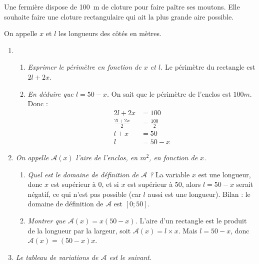 \documentclass[11pt]{article}
\begin{document}
\begin{exercice}
  Une fermière dispose de 100~m de cloture pour faire paître ses moutons. Elle souhaite faire une cloture rectangulaire qui ait la plus grande aire possible.

  \begin{center}
  \end{center}
  On appelle $x$ et $l$ les longueurs des côtés en mètres.
  \begin{enumerate}
    \item 
      \begin{enumerate}
        \item \emph{Exprimer le périmètre en fonction de $x$ et $l$.} Le périmètre du rectangle est $2l+2x$.
        \item \emph{En déduire que $l=50-x$.} On sait que le périmètre de l'enclos est $100m$. Donc :
          \begin{align*}
            2l+2x&=100\\
            \frac{2l+2x}{2}&=\frac{100}{2}\\
            l+x&=50\\
            l&=50-x
          \end{align*}
      \end{enumerate}
    \item \emph{On appelle $\mathcal{A}(x)$ l'aire de l'enclos, en $m^2$, en fonction de $x$.}
      \begin{enumerate}
        \item \emph{Quel est le domaine de définition de $\mathcal{A}$ ?} La variable $x$ est une longueur, donc $x$ est supérieur à 0, et si $x$ est supérieur à 50, alors $l=50-x$ serait négatif, ce qui n'est pas possible (car $l$ aussi est une longueur). Bilan : le domaine de définition de $\mathcal{A}$ est $\left[ 0;50 \right]$.
        \item \emph{Montrer que $\mathcal{A}(x)=x\left( 50-x \right)$.} L'aire d'un rectangle est le produit de la longueur par la largeur, soit $\mathcal{A}(x)=l\times x$. Mais $l=50-x$, donc $\mathcal{A}(x)=\left( 50-x \right)x$.
      \end{enumerate}
    \item \emph{Le tableau de variations de $\mathcal{A}$ est le suivant.}

\end{enumerate}
\end{exercice}
\end{document}
